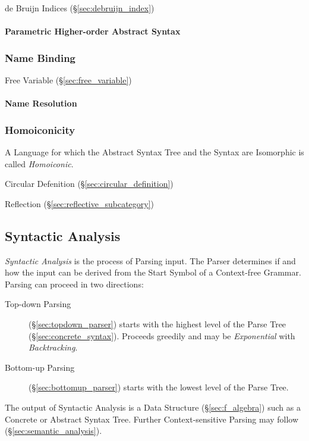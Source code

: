 de Bruijn Indices (\S\ref{sec:debruijn_index})



\paragraph{Parametric Higher-order Abstract Syntax}
\label{sec:phoas}\hfill



\subsubsection{Name Binding}\label{sec:name_binding}

Free Variable (\S\ref{sec:free_variable})



\paragraph{Name Resolution}\label{sec:name_resolution}\hfill




\subsubsection{Homoiconicity}\label{sec:homoiconicity}

A Language for which the Abstract Syntax Tree and the Syntax are
Isomorphic is called \emph{Homoiconic}.

Circular Defenition (\S\ref{sec:circular_definition})

Reflection (\S\ref{sec:reflective_subcategory})



\subsection{Syntactic Analysis}\label{sec:syntactic_analysis}

\emph{Syntactic Analysis} is the process of Parsing input. The Parser
determines if and how the input can be derived from the Start Symbol
of a Context-free Grammar. Parsing can proceed in two directions:
\begin{description}
\item [Top-down Parsing] (\S\ref{sec:topdown_parser}) starts with
  the highest level of the Parse Tree (\S\ref{sec:concrete_syntax}).
  Proceeds greedily and may be \emph{Exponential} with
  \emph{Backtracking}.
\item [Bottom-up Parsing] (\S\ref{sec:bottomup_parser}) starts with
  the lowest level of the Parse Tree.
\end{description}
The output of Syntactic Analysis is a Data Structure
(\S\ref{sec:f_algebra}) such as a Concrete or Abstract Syntax Tree.
Further Context-sensitive Parsing may follow
(\S\ref{sec:semantic_analysis}).




